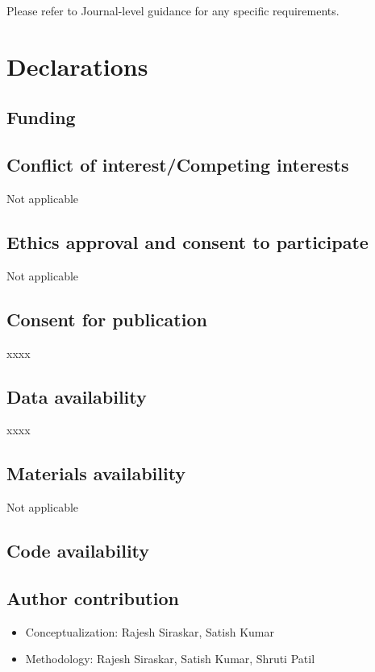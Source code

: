 \documentclass[sn-basic]{sn-jnl} %
\begin{document}
Please refer to Journal-level guidance for any specific requirements.

\section*{Declarations}

\subsection*{Funding}

\subsection*{Conflict of interest/Competing interests}
Not applicable

\subsection*{Ethics approval and consent to participate}
Not applicable

\subsection*{Consent for publication}
xxxx

\subsection*{Data availability}
xxxx

\subsection*{Materials availability}
Not applicable

\subsection*{Code availability}

\subsection*{Author contribution}
\begin{itemize}
        \item Conceptualization: Rajesh Siraskar, Satish Kumar
        \item Methodology: Rajesh Siraskar, Satish Kumar, Shruti Patil
\end{itemize}
\end{document}
